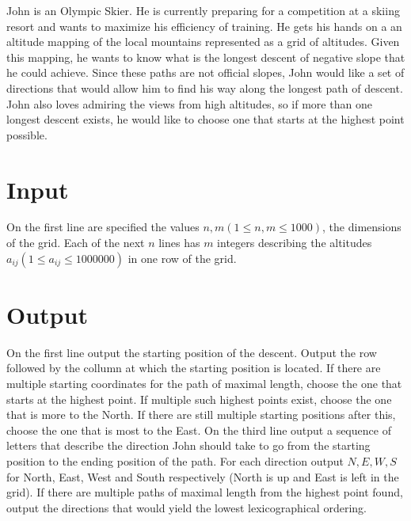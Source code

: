 John is an Olympic Skier. He is currently preparing for a competition at a skiing resort and wants to maximize his efficiency of training. He gets his hands on a an altitude mapping of the local mountains represented as a grid of altitudes. Given this mapping, he wants to know what is the longest descent of negative slope that he could achieve. Since these paths are not official slopes, John would like a set of directions that would allow him to find his way along the longest path of descent. John also loves admiring the views from high altitudes, so if more than one longest descent exists, he would like to choose one that starts at the highest point possible.

\section*{Input}
On the first line are specified the values $n, m (1 \leq n, m \leq 1000)$, the dimensions of the grid.
Each of the next $n$ lines has $m$ integers describing the altitudes $a_{ij} (1 \leq a_{ij} \leq 1000000)$ in one row of the grid.

\section*{Output}
On the first line output the starting position of the descent. Output the row followed by the collumn at which the starting position is located. If there are multiple starting coordinates for the path of maximal length, choose the one that starts at the highest point. If multiple such highest points exist, choose the one that is more to the North. If there are still multiple starting positions after this, choose the one that is most to the East.
On the third line output a sequence of letters that describe the direction John should take to go from the starting position to the ending position of the path. For each direction output $N, E, W, S$ for North, East, West and South respectively (North is up and East is left in the grid). If there are multiple paths of maximal length from the highest point found, output the directions that would yield the lowest lexicographical ordering. 
